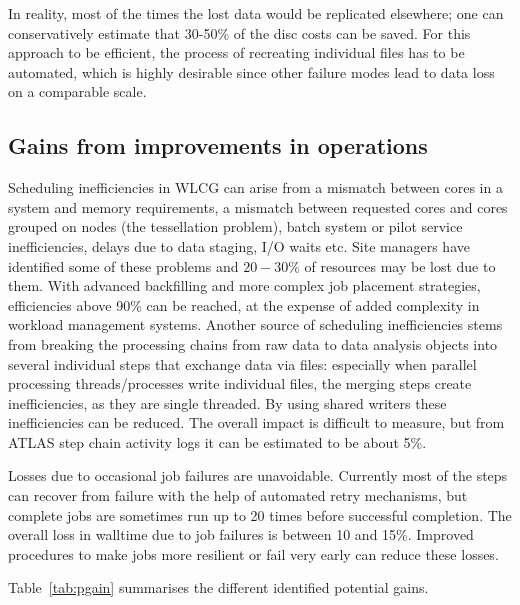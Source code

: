 In reality, most of the times the lost data would be replicated
elsewhere; one can conservatively estimate that 30-50\% of the disc
costs can be saved. For this approach to be efficient, the process of
recreating individual files has to be automated, which is highly
desirable since other failure modes lead to data loss on a comparable
scale.

\subsection{Gains from improvements in operations}
Scheduling inefficiencies in WLCG can arise from a mismatch between
cores in a system and memory requirements, a mismatch between
requested cores and cores grouped on nodes (the tessellation problem),
batch system or pilot service inefficiencies, delays due to data
staging, I/O waits etc. Site managers have identified some of these
problems and $20-30\%$ of resources may be lost due to them. With
advanced backfilling and more complex job placement strategies,
efficiencies above 90\% can be reached, at the expense of added
complexity in workload management systems. Another source of
scheduling inefficiencies stems from breaking the processing chains
from raw data to data analysis objects into several individual steps
that exchange data via files: especially when parallel processing
threads/processes write individual files, the merging steps create
inefficiencies, as they are single threaded. By using shared writers
these inefficiencies can be reduced. The overall impact is difficult
to measure, but from ATLAS step chain activity logs it can be
estimated to be about 5\%.

Losses due to occasional job failures are unavoidable. Currently most
of the steps can recover from failure with the help of automated retry
mechanisms, but complete jobs are sometimes run up to 20 times before
successful completion. The overall loss in walltime due to job
failures is between 10 and 15\%. Improved procedures to make jobs more
resilient or fail very early can reduce these losses.

Table~\ref{tab:pgain} summarises the different identified potential gains.

